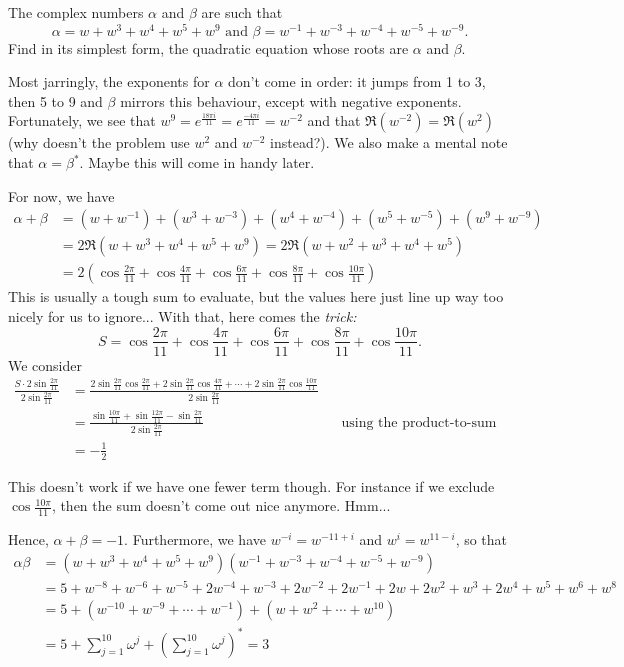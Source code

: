 \documentclass[../jarvis.tex]{subfiles}
\begin{document}
\begin{example}[cont.]
The complex numbers $\alpha$ and $\beta$ are such that
$$\alpha=w+w^3+w^4+w^5+w^9 \text{ and } \beta=w^{-1}+w^{-3}+w^{-4}+w^{-5}+w^{-9}.$$
Find in its simplest form, the quadratic equation whose roots are $\alpha$ and $\beta$.
\end{example}
Most jarringly, the exponents for $\alpha$ don't come in order: it jumps from 1 to 3, then 5 to 9 and $\beta$ mirrors this behaviour, except with negative exponents. Fortunately, we see that $w^9=e^{\frac{18\pi i}{11}}=e^{\frac{-4\pi i}{11}}=w^{-2}$ and that $\Re(w^{-2})=\Re(w^2)$ (why doesn't the problem use $w^2$ and $w^{-2}$ instead?). We also make a mental note that $\alpha=\beta^{*}$. Maybe this will come in handy later.

For now, we have
\begin{align*}
    \alpha+\beta &= (w+w^{-1})+(w^3+w^{-3})+(w^4+w^{-4})+(w^5+w^{-5})+(w^9+w^{-9}) \\
    &= 2\Re(w+w^3+w^4+w^5+w^9) = 2\Re(w+w^2+w^3+w^4+w^5) \\
    &= 2\left(\cos{\frac{2\pi}{11}}+\cos{\frac{4\pi}{11}}+\cos{\frac{6\pi}{11}}+\cos{\frac{8\pi}{11}}+\cos{\frac{10\pi}{11}}\right)
\end{align*}
This is usually a tough sum to evaluate, but the values here just line up way too nicely for us to ignore... With that, here comes the \textit{trick:}  $$S=\cos{\frac{2\pi}{11}}+\cos{\frac{4\pi}{11}}+\cos{\frac{6\pi}{11}}+\cos{\frac{8\pi}{11}}+\cos{\frac{10\pi}{11}}.$$ We consider
\begin{align*}
    \frac{S\cdot2\sin{\frac{2\pi}{11}}}{2\sin{\frac{2\pi}{11}}} &= \frac{2\sin{\frac{2\pi}{11}}\cos{\frac{2\pi}{11}}+2\sin{\frac{2\pi}{11}}\cos{\frac{4\pi}{11}}+\cdots +2\sin{\frac{2\pi}{11}}\cos{\frac{10\pi}{11}}}{2\sin{\frac{2\pi}{11}}}\\
    &= \frac{\sin{\frac{10\pi}{11}}+\sin{\frac{12\pi}{11}}-\sin{\frac{2\pi}{11}}}{2\sin{\frac{2\pi}{11}}} &&\text{using the product-to-sum formula}\\
    &= -\frac{1}{2}
\end{align*}
\begin{remark}
This doesn't work if we have one fewer term though. For instance if we exclude $\cos{\frac{10\pi}{11}}$, then the sum doesn't come out nice anymore. Hmm...
\end{remark}
Hence, $\alpha+\beta=-1$. Furthermore, we have $w^{-i}=w^{-11+i}$ and $w^i=w^{11-i}$, so that
\begin{align*}
    \alpha\beta&=(w+w^3+w^4+w^5+w^9)(w^{-1}+w^{-3}+w^{-4}+w^{-5}+w^{-9}) \\
    &=5+w^{-8}+w^{-6}+w^{-5}+2w^{-4}+w^{-3}+2w^{-2}+2w^{-1}+2w+2w^2+w^3+2w^4+w^5+w^6+w^8 \\
    &=5+(w^{-10}+w^{-9}+\cdots+w^{-1})+(w+w^2+\cdots+w^{10}) \\
    &=5+\sum_{j=1}^{10} \omega^{j}+\left(\sum_{j=1}^{10} \omega^{j}\right)^{*} = 3
\end{align*}
\end{document}
